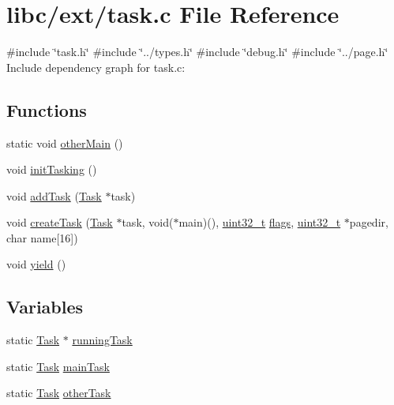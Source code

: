 \hypertarget{a00044}{}\section{libc/ext/task.c File Reference}
\label{a00044}
{\ttfamily \#include \char`\"{}task.\+h\char`\"{}}\newline
{\ttfamily \#include \char`\"{}../types.\+h\char`\"{}}\newline
{\ttfamily \#include \char`\"{}debug.\+h\char`\"{}}\newline
{\ttfamily \#include \char`\"{}../page.\+h\char`\"{}}\newline
Include dependency graph for task.\+c\+:
\subsection*{Functions}
\begin{DoxyCompactItemize}
\item 
static void \hyperlink{a00044_a4337f8ca98d2a8f8e09bf6e26b4e8bb0_a4337f8ca98d2a8f8e09bf6e26b4e8bb0}{other\+Main} ()
\item 
void \hyperlink{a00044_aea945e91746a54801f4763ad264746b9_aea945e91746a54801f4763ad264746b9}{init\+Tasking} ()
\item 
void \hyperlink{a00044_a2814ff5e4f081736448dc705b05edcd1_a2814ff5e4f081736448dc705b05edcd1}{add\+Task} (\hyperlink{a00134}{Task} $\ast$task)
\item 
void \hyperlink{a00044_ad60a944f16bf46088320833cf2464e1e_ad60a944f16bf46088320833cf2464e1e}{create\+Task} (\hyperlink{a00134}{Task} $\ast$task, void($\ast$main)(), \hyperlink{a00092_a435d1572bf3f880d55459d9805097f62_a435d1572bf3f880d55459d9805097f62}{uint32\+\_\+t} \hyperlink{a00065_aa2585d779da0ab21273a8d92de9a0ebe_aa2585d779da0ab21273a8d92de9a0ebe}{flags}, \hyperlink{a00092_a435d1572bf3f880d55459d9805097f62_a435d1572bf3f880d55459d9805097f62}{uint32\+\_\+t} $\ast$pagedir, char name\mbox{[}16\mbox{]})
\item 
void \hyperlink{a00044_a58c8b2ad0ea491a6642e5e1cbd358c89_a58c8b2ad0ea491a6642e5e1cbd358c89}{yield} ()
\end{DoxyCompactItemize}
\subsection*{Variables}
\begin{DoxyCompactItemize}
\item 
static \hyperlink{a00134}{Task} $\ast$ \hyperlink{a00044_a2c195d425b4a6791b3a89f7b219f93d9_a2c195d425b4a6791b3a89f7b219f93d9}{running\+Task}
\item 
static \hyperlink{a00134}{Task} \hyperlink{a00044_a228ac88416ebaa8713846e3e5e3e9b6d_a228ac88416ebaa8713846e3e5e3e9b6d}{main\+Task}
\item 
static \hyperlink{a00134}{Task} \hyperlink{a00044_ab0e87ab98b8b029839a398838d16e1f0_ab0e87ab98b8b029839a398838d16e1f0}{other\+Task}
\end{DoxyCompactItemize}


